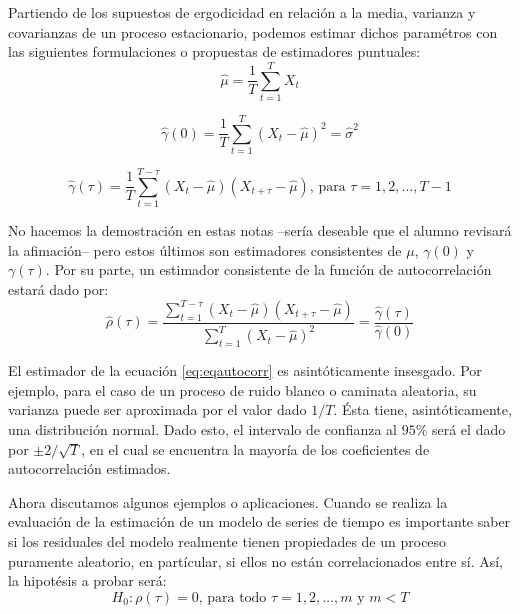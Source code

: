 \documentclass[
]{book}
\begin{document}
Partiendo de los supuestos de ergodicidad en relación a la media, varianza y covarianzas de un proceso estacionario, podemos estimar dichos paramétros con las siguientes formulaciones o propuestas de estimadores puntuales:
\begin{equation}
    \hat{\mu} = \frac{1}{T} \sum^T_{t=1} X_t
    \label{eq:em6}
\end{equation}

\begin{equation}
    \hat{\gamma}(0) = \frac{1}{T} \sum^T_{t=1} (X_t - \hat{\mu})^2 = \hat{\sigma}^2
    \label{eq:em7}
\end{equation}

\begin{equation}
    \hat{\gamma}(\tau) = \frac{1}{T} \sum^{T - \tau}_{t=1} (X_t - \hat{\mu})(X_{t+\tau} - \hat{\mu}) \mbox{, para } \tau = 1, 2, \ldots, T-1
    \label{eq:em8}
\end{equation}

No hacemos la demostración en estas notas --sería deseable que el alumno revisará la afimación-- pero estos últimos son estimadores consistentes de \(\mu\), \(\gamma(0)\) y \(\gamma(\tau)\). Por su parte, un estimador consistente de la función de autocorrelación estará dado por:
\begin{equation}
  \hat{\rho}(\tau) = \frac{\sum^{T - \tau}_{t=1} (X_t - \hat{\mu})(X_{t+\tau} - \hat{\mu})}{\sum^T_{t=1} (X_t - \hat{\mu})^2} = \frac{\hat{\gamma}(\tau)}{\hat{\gamma}(0)}
  \label{eq:eqautocorr}
\end{equation}

El estimador de la ecuación \eqref{eq:eqautocorr} es asintóticamente insesgado. Por ejemplo, para el caso de un proceso de ruido blanco o caminata aleatoria, su varianza puede ser aproximada por el valor dado \(1/T\). Ésta tiene, asintóticamente, una distribución normal. Dado esto, el intervalo de confianza al \(95\%\) será el dado por \(\pm 2/\sqrt{T}\), en el cual se encuentra la mayoría de los coeficientes de autocorrelación estimados.

Ahora discutamos algunos ejemplos o aplicaciones. Cuando se realiza la evaluación de la estimación de un modelo de series de tiempo es importante saber si los residuales del modelo realmente tienen propiedades de un proceso puramente aleatorio, en partícular, si ellos no están correlacionados entre sí. Así, la hipotésis a probar será:
\begin{equation}
    H_0 : \rho(\tau) = 0 \mbox{, para todo } \tau = 1, 2, \ldots, m \mbox{ y } m < T
    \label{eq:eqautocorr1}
\end{equation}
\end{document}
